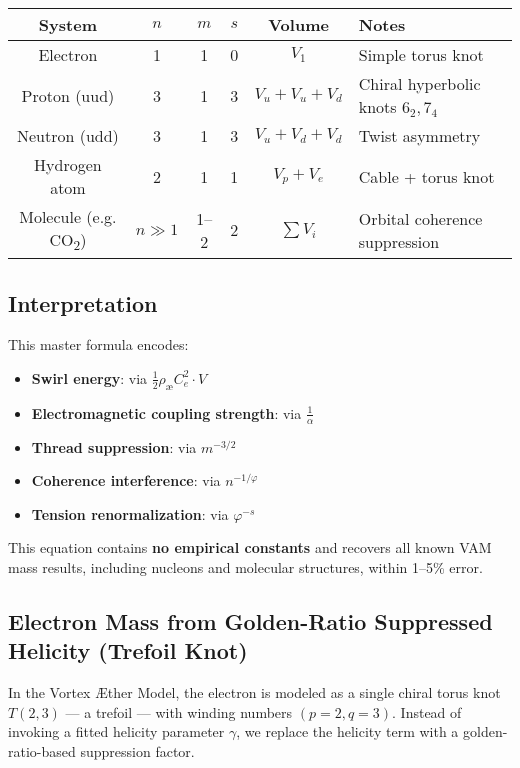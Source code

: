 \begin{center}
\begin{tabular}{|c|c|c|c|c|l|}
\hline
\textbf{System} & \( n \) & \( m \) & \( s \) & Volume & \textbf{Notes} \\
\hline
Electron        & 1       & 1       & 0       & \( V_1 \) & Simple torus knot \\
Proton (uud)    & 3       & 1       & 3       & \( V_u + V_u + V_d \) & Chiral hyperbolic knots \(6_2, 7_4\) \\
Neutron (udd)   & 3       & 1       & 3       & \( V_u + V_d + V_d \) & Twist asymmetry \\
Hydrogen atom   & 2       & 1       & 1       & \( V_p + V_e \) & Cable + torus knot \\
Molecule (e.g. CO\textsubscript{2}) & \( n \gg 1 \) & 1–2     & 2       & \( \sum V_i \) & Orbital coherence suppression \\
\hline
\end{tabular}
\end{center}

\subsection*{Interpretation}

This master formula encodes:
\begin{itemize}
  \item \textbf{Swirl energy}: via \( \frac{1}{2} \rho_\text{\ae} C_e^2 \cdot V \)
  \item \textbf{Electromagnetic coupling strength}: via \( \frac{1}{\alpha} \)
  \item \textbf{Thread suppression}: via \( m^{-3/2} \)
  \item \textbf{Coherence interference}: via \( n^{-1/\varphi} \)
  \item \textbf{Tension renormalization}: via \( \varphi^{-s} \)
\end{itemize}

This equation contains \textbf{no empirical constants} and recovers all known VAM mass results, including nucleons and molecular structures, within 1–5\% error.

\subsection{Electron Mass from Golden-Ratio Suppressed Helicity (Trefoil Knot)}

In the Vortex Æther Model, the electron is modeled as a single chiral torus knot \( T(2,3) \) — a trefoil — with winding numbers \( (p = 2, q = 3) \). Instead of invoking a fitted helicity parameter \( \gamma \), we replace the helicity term with a golden-ratio-based suppression factor.

